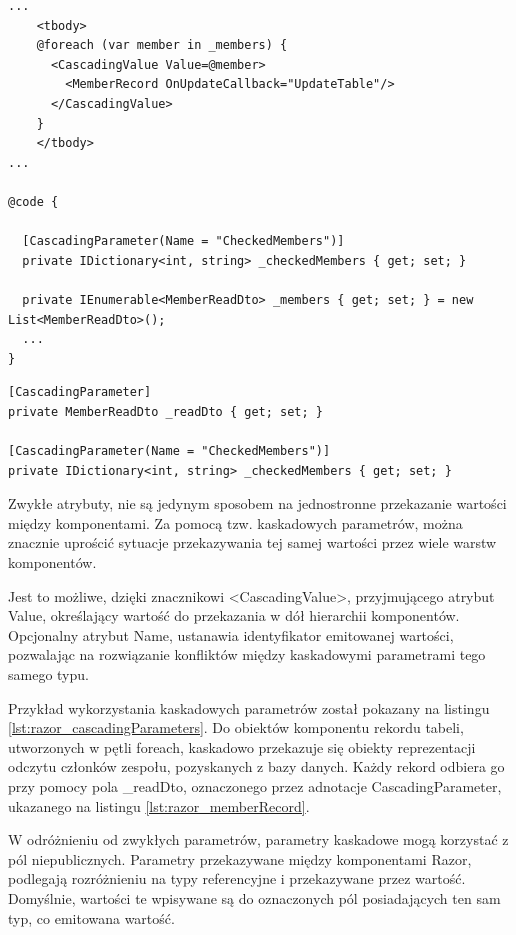 \begin{lstlisting}[language=CSharp, caption={Fragmenty komponentu tabeli członków zespołu wykorzystujące kaskadowe parametry}, label=lst:razor_cascadingParameters]
...
    <tbody>
    @foreach (var member in _members) {
      <CascadingValue Value=@member>
        <MemberRecord OnUpdateCallback="UpdateTable"/>
      </CascadingValue>
    }
    </tbody>
...

@code {

  [CascadingParameter(Name = "CheckedMembers")]
  private IDictionary<int, string> _checkedMembers { get; set; }

  private IEnumerable<MemberReadDto> _members { get; set; } = new List<MemberReadDto>();
  ...
}
\end{lstlisting}

\begin{lstlisting}[language=CSharp, caption={Kaskadowe parametry, komponentu rekordu tabeli członków zespołu}, label=lst:razor_memberRecord]
[CascadingParameter]
private MemberReadDto _readDto { get; set; }

[CascadingParameter(Name = "CheckedMembers")]
private IDictionary<int, string> _checkedMembers { get; set; }
\end{lstlisting}

Zwykłe atrybuty, nie są jedynym sposobem na jednostronne przekazanie wartości między komponentami. Za pomocą tzw. kaskadowych parametrów, można znacznie uprościć sytuacje przekazywania tej samej wartości przez wiele warstw komponentów. 

Jest to możliwe, dzięki znacznikowi <CascadingValue>, przyjmującego atrybut Value, określający wartość do przekazania w dół hierarchii komponentów. Opcjonalny atrybut Name, ustanawia identyfikator emitowanej wartości, pozwalając na rozwiązanie konfliktów między kaskadowymi parametrami tego samego typu.

Przykład wykorzystania kaskadowych parametrów został pokazany na listingu \ref{lst:razor_cascadingParameters}. Do obiektów komponentu rekordu tabeli, utworzonych w pętli foreach, kaskadowo przekazuje się obiekty reprezentacji odczytu członków zespołu, pozyskanych z bazy danych. Każdy rekord odbiera go przy pomocy pola \_readDto, oznaczonego przez adnotacje CascadingParameter, ukazanego na listingu \ref{lst:razor_memberRecord}.

W odróżnieniu od zwykłych parametrów, parametry kaskadowe mogą korzystać z pól niepublicznych. Parametry przekazywane między komponentami Razor, podlegają rozróżnieniu na typy referencyjne i przekazywane przez wartość. Domyślnie, wartości te wpisywane są do oznaczonych pól posiadających ten sam typ, co emitowana wartość. 

